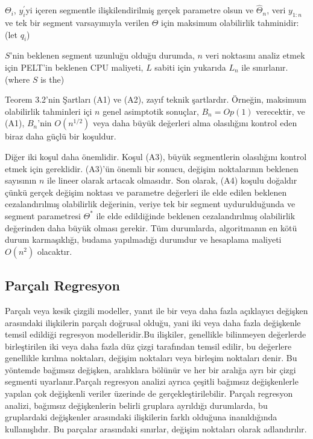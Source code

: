 \documentclass[12pt,twoside]{deuthesis}
\begin{document}
\(\Theta_i\), \(y_i^{'}\)yi içeren segmentle ilişkilendirilmiş gerçek parametre olsun ve \(\hat{\Theta}_n\), veri \(y_{1:n}\) ve tek bir segment varsayımıyla verilen \(\Theta\) için maksimum olabilirlik tahminidir: (let \(q_i\))

\(S\)'nin beklenen segment uzunluğu olduğu durumda, \(n\) veri noktasını analiz etmek için PELT'in beklenen CPU maliyeti, \(L\) sabiti için yukarıda \(L_n\) ile sınırlanır. (where \(S\) is the)

Teorem 3.2'nin Şartları (A1) ve (A2), zayıf teknik şartlardır. Örneğin, maksimum olabilirlik tahminleri içi \(n\) genel asimptotik sonuçlar, \(B_n = Op(1)\) verecektir, ve (A1), \(B_n\)'nin \(O(n^{1/2})\) veya daha büyük değerleri alma olasılığını kontrol eden biraz daha güçlü bir koşuldur.

Diğer iki koşul daha önemlidir. Koşul (A3), büyük segmentlerin olasılığını kontrol etmek için gereklidir. (A3)'ün önemli bir sonucu, değişim noktalarının beklenen sayısının \(n\) ile lineer olarak artacak olmasıdır. Son olarak, (A4) koşulu doğaldır çünkü gerçek değişim noktası ve parametre değerleri ile elde edilen beklenen cezalandırılmış olabilirlik değerinin, veriye tek bir segment uydurulduğunda ve segment parametresi \(\Theta^*\) ile elde edildiğinde beklenen cezalandırılmış olabilirlik değerinden daha büyük olması gerekir. Tüm durumlarda, algoritmanın en kötü durum karmaşıklığı, budama yapılmadığı durumdur ve hesaplama maliyeti \(O(n^2)\) olacaktır.

\subsection{Parçalı Regresyon}\label{paruxe7alux131-regresyon}

Parçalı veya kesik çizgili modeller, yanıt ile bir veya daha fazla açıklayıcı değişken arasındaki ilişkilerin parçalı doğrusal olduğu, yani iki veya daha fazla değişkenle temsil edildiği regresyon modelleridir.Bu ilişkiler, genellikle bilinmeyen değerlerde birleştirilen iki veya daha fazla düz çizgi tarafından temsil edilir, bu değerlere genellikle kırılma noktaları, değişim noktaları veya birleşim noktaları denir. Bu yöntemde bağımsız değişken, aralıklara bölünür ve her bir aralığa ayrı bir çizgi segmenti uyarlanır.Parçalı regresyon analizi ayrıca çeşitli bağımsız değişkenlerle yapılan çok değişkenli veriler üzerinde de gerçekleştirilebilir. Parçalı regresyon analizi, bağımsız değişkenlerin belirli gruplara ayrıldığı durumlarda, bu gruplardaki değişkenler arasındaki ilişkilerin farklı olduğuna inanıldığında kullanışlıdır. Bu parçalar arasındaki sınırlar, değişim noktaları olarak adlandırılır.
\end{document}
